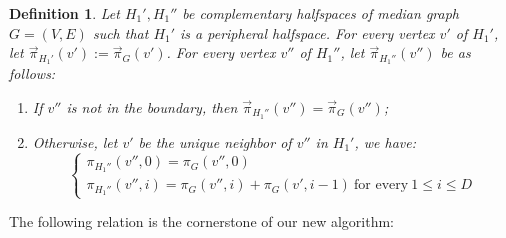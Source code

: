\documentclass[11pt,letterpaper]{article}
\newtheorem{definition}{Definition}
\begin{document}
\begin{definition}
Let $H_1',H_1''$ be complementary halfspaces of median graph $G=(V,E)$ such that $H_1'$ is a peripheral halfspace.
For every vertex $v'$ of $H_1'$, let $\overrightarrow{\pi}_{H_1'}(v') := \overrightarrow{\pi}_G(v')$.
For every vertex $v''$ of $H_1''$, let $\overrightarrow{\pi}_{H_1''}(v'')$ be as follows:
\begin{enumerate}
    \item If $v''$ is not in the boundary, then $\overrightarrow{\pi}_{H_1''}(v'') = \overrightarrow{\pi}_G(v'')$;
    \item Otherwise, let $v'$ be the unique neighbor of $v''$ in $H_1'$, we have:
    $$\begin{cases}
        \pi_{H_1''}(v'',0) = \pi_G(v'',0) \\
        \pi_{H_1''}(v'',i) = \pi_G(v'',i) + \pi_G(v',i-1) \ \text{for every} \ 1 \le i \le D
    \end{cases}$$
\end{enumerate}
\end{definition}

The following relation is the cornerstone of our new algorithm:
\end{document}
